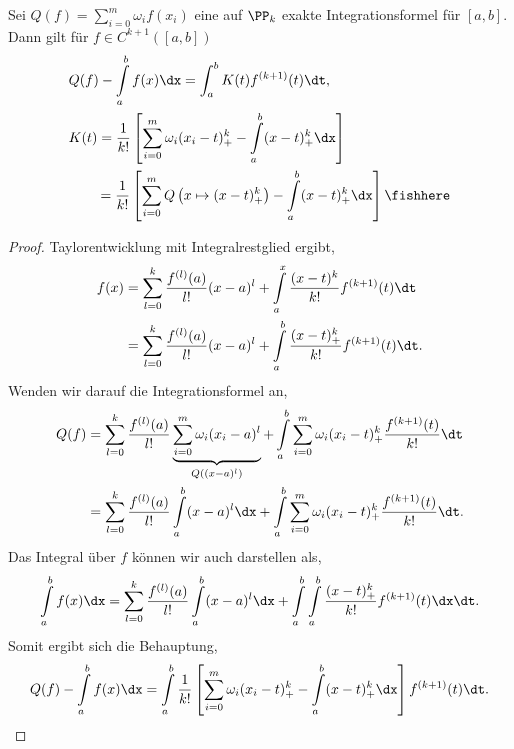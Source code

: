 \begin{prop}
\label{prop:4.5}
Sei $Q(f)=\sum\limits_{i=0}^m \omega_if(x_i)$ eine auf $\PP_k$ exakte
Integrationsformel für $[a,b]$. Dann gilt für $f\in C^{k+1}([a,b])$
\begin{align*}
&Q(f) - \int\limits_a^b f(x)\dx = \int_a^b K(t)f^{(k+1)}(t)\dt,\\
&K(t) = \frac{1}{k!}\left[\sum\limits_{i=0}^m \omega_i (x_i-t)_+^k -
\int\limits_a^b (x-t)_+^k \dx \right]\\
&\qquad= \frac{1}{k!}\left[\sum\limits_{i=0}^m
Q\left(x\mapsto (x-t)_+^k\right) - \int\limits_a^b (x-t)_+^k \dx
\right]\fishhere
\end{align*}
\end{prop}
\begin{proof}
Taylorentwicklung mit Integralrestglied ergibt,
\begin{align*}
f(x) &= \sum\limits_{l=0}^k \frac{f^{(l)}(a)}{l!}(x-a)^l + \int\limits_a^x
\frac{(x-t)^k}{k!}f^{(k+1)}(t)\dt \\&=
\sum\limits_{l=0}^k \frac{f^{(l)}(a)}{l!}(x-a)^l + \int\limits_a^b
\frac{(x-t)_+^k}{k!}f^{(k+1)}(t)\dt.
\end{align*}
Wenden wir darauf die Integrationsformel an,
\begin{align*}
Q(f) &= \sum\limits_{l=0}^k \frac{f^{(l)}(a)}{l!}\underbrace{\sum\limits_{i=0}^m
\omega_i (x_i-a)^l}_{Q((x-a)^l)} + \int\limits_a^b \sum\limits_{i=0}^m \omega_i
(x_i-t)_+^k \frac{f^{(k+1)}(t)}{k!}\dt\\
&= \sum\limits_{l=0}^k \frac{f^{(l)}(a)}{l!}\int\limits_a^b (x-a)^l\dx +
\int\limits_a^b \sum\limits_{i=0}^m \omega_i (x_i-t)_+^k
\frac{f^{(k+1)}(t)}{k!}\dt.
\end{align*}
Das Integral über $f$ können wir auch darstellen als,
\begin{align*}
\int\limits_a^b f(x)\dx = \sum\limits_{l=0}^k
\frac{f^{(l)}(a)}{l!}\int\limits_a^b (x-a)^l\dx +
\int\limits_a^b\int\limits_a^b \frac{(x-t)_+^k}{k!}f^{(k+1)}(t)\dx\dt.
\end{align*}
Somit ergibt sich die Behauptung,
\begin{align*}
Q(f) - \int\limits_a^b f(x)\dx = 
\int\limits_a^b\frac{1}{k!}\left[ \sum\limits_{i=0}^m \omega_i (x_i-t)_+^k
 - \int\limits_a^b
(x-t)_+^k\dx\right]f^{(k+1)}(t)\dt.\qedhere
\end{align*}
\end{proof}

